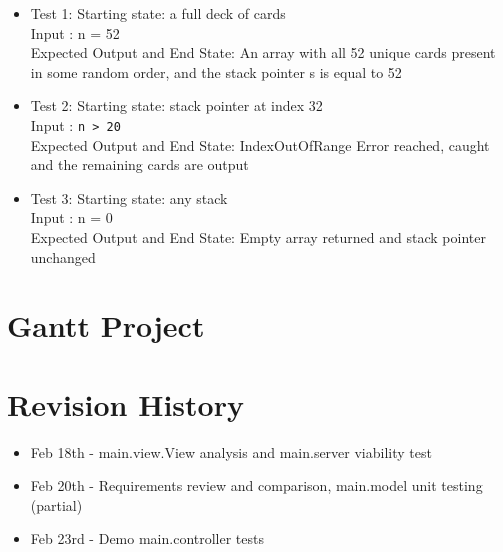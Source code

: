 \documentclass{article}
\begin{document}
\begin{itemize}
    \item Test 1: Starting state: a full deck of cards\\
    Input : n = 52\\
    Expected Output and End State: An array with all 52 unique cards present in some random order, and the stack pointer s is equal to 52
    \item Test 2: Starting state: stack pointer at index 32\\
    Input : \verb|n > 20|\\
    Expected Output and End State: IndexOutOfRange Error reached, caught and the remaining cards are output
    \item Test 3: Starting state: any stack\\
    Input : n = 0\\
    Expected Output and End State: Empty array returned and stack pointer unchanged
\end{itemize}

\section{Gantt Project}



\section{Revision History}

\begin{itemize}
    \item Feb 18th - main.view.View analysis and main.server viability test
    \item Feb 20th - Requirements review and comparison, main.model unit testing (partial)
    \item Feb 23rd - Demo main.controller tests
\end{itemize}
\end{document}

